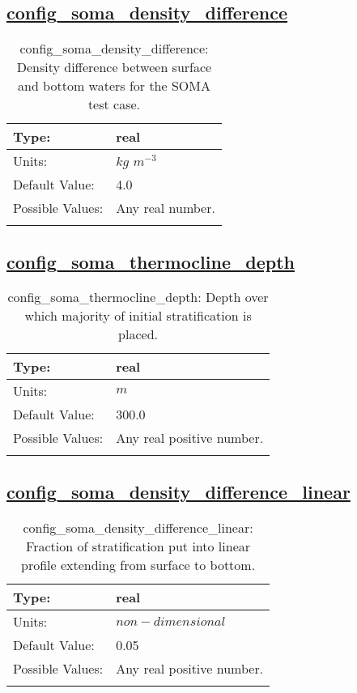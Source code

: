 \subsection[config\_soma\_density\_difference]{\hyperref[sec:nm_tab_soma]{config\_soma\_density\_difference}}
\label{subsec:nm_sec_config_soma_density_difference}
\begin{center}
\begin{longtable}{| p{2.0in} || p{4.0in} |}
    \hline
    Type: & real \\
    \hline
    Units: & $kg$ $m^{-3}$ \\
    \hline
    Default Value: & 4.0 \\
    \hline
    Possible Values: & Any real number. \\
    \hline
    \caption{config\_soma\_density\_difference: Density difference between surface and bottom waters for the SOMA test case.}
\end{longtable}
\end{center}
\subsection[config\_soma\_thermocline\_depth]{\hyperref[sec:nm_tab_soma]{config\_soma\_thermocline\_depth}}
\label{subsec:nm_sec_config_soma_thermocline_depth}
\begin{center}
\begin{longtable}{| p{2.0in} || p{4.0in} |}
    \hline
    Type: & real \\
    \hline
    Units: & $m$ \\
    \hline
    Default Value: & 300.0 \\
    \hline
    Possible Values: & Any real positive number. \\
    \hline
    \caption{config\_soma\_thermocline\_depth: Depth over which majority of initial stratification is placed.}
\end{longtable}
\end{center}
\subsection[config\_soma\_density\_difference\_linear]{\hyperref[sec:nm_tab_soma]{config\_soma\_density\_difference\_linear}}
\label{subsec:nm_sec_config_soma_density_difference_linear}
\begin{center}
\begin{longtable}{| p{2.0in} || p{4.0in} |}
    \hline
    Type: & real \\
    \hline
    Units: & $non-dimensional$ \\
    \hline
    Default Value: & 0.05 \\
    \hline
    Possible Values: & Any real positive number. \\
    \hline
    \caption{config\_soma\_density\_difference\_linear: Fraction of stratification put into linear profile extending from surface to bottom.}
\end{longtable}
\end{center}
